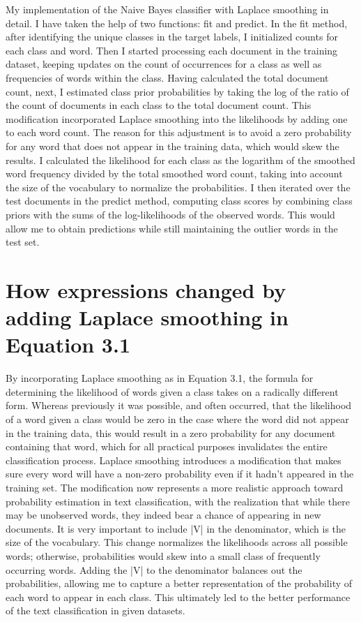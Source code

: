 \documentclass{article}
\begin{document}
My implementation of the Naive Bayes classifier with Laplace smoothing in detail. I have taken the help of two functions: fit and predict. In the fit method, after identifying the unique classes in the target labels, I initialized counts for each class and word. Then I started processing each document in the training dataset, keeping updates on the count of occurrences for a class as well as frequencies of words within the class. Having calculated the total document count, next, I estimated class prior probabilities by taking the log of the ratio of the count of documents in each class to the total document count. This modification incorporated Laplace smoothing into the likelihoods by adding one to each word count. The reason for this adjustment is to avoid a zero probability for any word that does not appear in the training data, which would skew the results. I calculated the likelihood for each class as the logarithm of the smoothed word frequency divided by the total smoothed word count, taking into account the size of the vocabulary to normalize the probabilities. I then iterated over the test documents in the predict method, computing class scores by combining class priors with the sums of the log-likelihoods of the observed words. This would allow me to obtain predictions while still maintaining the outlier words in the test set.

\section*{How expressions changed by adding Laplace smoothing in Equation 3.1}

By incorporating Laplace smoothing as in Equation 3.1, the formula for determining the likelihood of words given a class takes on a radically different form. Whereas previously it was possible, and often occurred, that the likelihood of a word given a class would be zero in the case where the word did not appear in the training data, this would result in a zero probability for any document containing that word, which for all practical purposes invalidates the entire classification process. Laplace smoothing introduces a modification that makes sure every word will have a non-zero probability even if it hadn't appeared in the training set. The modification now represents a more realistic approach toward probability estimation in text classification, with the realization that while there may be unobserved words, they indeed bear a chance of appearing in new documents. It is very important to include |V| in the denominator, which is the size of the vocabulary. This change normalizes the likelihoods across all possible words; otherwise, probabilities would skew into a small class of frequently occurring words. Adding the |V| to the denominator balances out the probabilities, allowing me to capture a better representation of the probability of each word to appear in each class. This ultimately led to the better performance of the text classification in given datasets.
\end{document}

